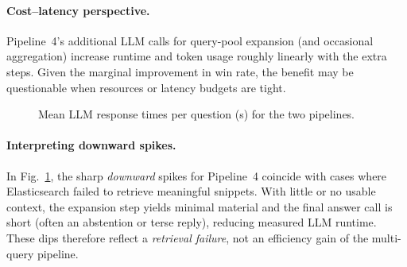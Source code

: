 \documentclass[manuscript,screen]{acmart}
\edef\PoneMean{\pgfplotsretval}
\edef\PfourMean{\pgfplotsretval}
\begin{document}
\begin{CCSXML}
\paragraph{Cost–latency perspective.}
Pipeline~4’s additional LLM calls for query-pool expansion (and occasional
aggregation) increase runtime and token usage roughly linearly with the extra
steps. Given the marginal improvement in win rate, the benefit may be
questionable when resources or latency budgets are tight.

\begin{figure}[H]
\centering
{}
\caption{Mean LLM response times per question (s) for the two pipelines.}
\label{fig:time-per-question}
\end{figure}

\paragraph{Interpreting downward spikes.}
In Fig.~\ref{fig:time-per-question}, the sharp \emph{downward} spikes for
Pipeline~4 coincide with cases where Elasticsearch failed to retrieve
meaningful snippets. With little or no usable context, the expansion step
yields minimal material and the final answer call is short (often an abstention
or terse reply), reducing measured LLM runtime. These dips therefore reflect a
\emph{retrieval failure}, not an efficiency gain of the multi-query
pipeline.


\end{CCSXML}
\end{document}
